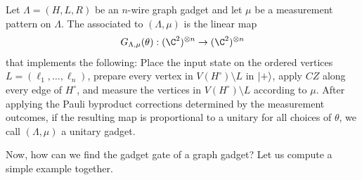 \begin{definition}
\label{def:gadget-gate}
Let $\Lambda=(H,L,R)$ be an $n$-wire graph gadget and let $\mu$ be a
measurement pattern on $\Lambda$. The  associated to
$(\Lambda,\mu)$ is the linear map
\begin{align}
    G_{\Lambda,\mu}(\theta):
    (\C^2)^{\otimes n}
    \to
    (\C^2)^{\otimes n}
\end{align}
that implements the following: Place the input state on the ordered vertices
$L=(\ell_1,\ldots,\ell_n)$, prepare every vertex in
$V(H^\circ)\setminus L$ in $\ket{+}$, apply $CZ$ along every edge of
$H^\circ$, and measure the vertices in $V(H^\circ)\setminus L$ according to
$\mu$. After applying the Pauli byproduct corrections determined by the measurement
outcomes, if the resulting map is proportional to a unitary for all choices of
\(\theta\), we call \((\Lambda,\mu)\) a unitary gadget.
\end{definition}

Now, how can we find the gadget gate of a graph gadget? Let us compute a simple example together.

